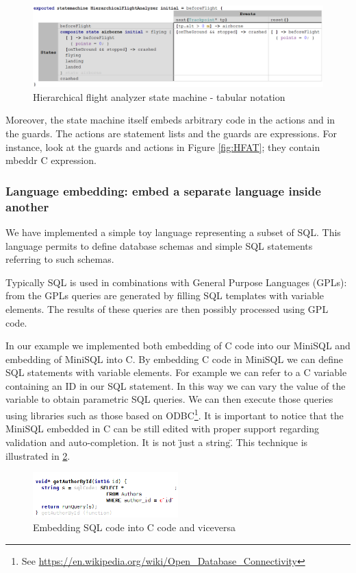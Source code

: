 \documentclass[preprint,numbers,10pt]{sigplanconf}
\begin{document}
\begin{figure}[ht!]
	\centering
	\includegraphics[scale=0.55]{screens/HierarchicalFlightAnalyzerTab}
	\caption{Hierarchical flight analyzer state machine - tabular notation}
	\label{fig:HFATab}
\end{figure}

Moreover, the state machine itself embeds arbitrary code in the actions
and in the guards. The actions are statement lists and the guards are expressions.
For instance, look at the guards and actions in Figure \ref{fig:HFAT}; they contain mbeddr C expression.

\subsubsection{Language embedding: embed a separate language inside another}
\label{evr:langembed}

We have implemented a simple toy language representing a subset of SQL. This language permits to define database schemas and simple SQL statements referring to such schemas.

Typically SQL is used in combinations with General Purpose Languages (GPLs): from the GPLs queries are generated by filling SQL templates with variable elements. The results of these queries are then possibly processed using GPL code.

In our example we implemented both embedding of C code into our MiniSQL and embedding of MiniSQL into C.
By embedding C code in MiniSQL we can define SQL statements with variable elements. For example we can refer to a C variable containing an ID in our SQL statement. In this way we can vary the value of the variable to obtain parametric SQL queries. We can then execute those queries using libraries such as those based on ODBC\footnote{See \url{https://en.wikipedia.org/wiki/Open_Database_Connectivity}}. It is important to notice that the MiniSQL embedded in C can be still edited with proper support regarding validation and auto-completion. It is not \"just a string\".
This technique is illustrated in \ref{fig:sqlembedding}.

\begin{figure}[H]
	\centering
	\includegraphics[width=0.50\textwidth]{screens/minisql_embedded.png}
	\caption{Embedding SQL code into C code and viceversa}
	\label{fig:sqlembedding}
\end{figure}
\end{document}
